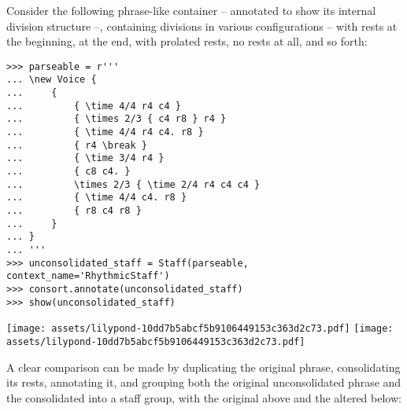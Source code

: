 Consider the following phrase-like container -- annotated to show its internal
division structure --, containing divisions in various configurations --
with rests at the beginning, at the end, with prolated rests, no rests at all,
and so forth:

\begin{comment}
<abjad>
parseable = r'''
\new Voice {
    {
        { \time 4/4 r4 c4 }
        { \times 2/3 { c4 r8 } r4 }
        { \time 4/4 r4 c4. r8 }
        { r4 \break }
        { \time 3/4 r4 }
        { c8 c4. }
        \times 2/3 { \time 2/4 r4 c4 c4 }
        { \time 4/4 c4. r8 }
        { r8 c4 r8 }
    }
}
'''
unconsolidated_staff = Staff(parseable, context_name='RhythmicStaff')
consort.annotate(unconsolidated_staff)
show(unconsolidated_staff)
</abjad>
\end{comment}

\begin{abjadbookoutput}
\begin{singlespacing}
\vspace{-0.5\baselineskip}
\begin{verbatim}
>>> parseable = r'''
... \new Voice {
...     {
...         { \time 4/4 r4 c4 }
...         { \times 2/3 { c4 r8 } r4 }
...         { \time 4/4 r4 c4. r8 }
...         { r4 \break }
...         { \time 3/4 r4 }
...         { c8 c4. }
...         \times 2/3 { \time 2/4 r4 c4 c4 }
...         { \time 4/4 c4. r8 }
...         { r8 c4 r8 }
...     }
... }
... '''
>>> unconsolidated_staff = Staff(parseable, context_name='RhythmicStaff')
>>> consort.annotate(unconsolidated_staff)
>>> show(unconsolidated_staff)
\end{verbatim}
\noindent\texttt{[image: assets/lilypond-10dd7b5abcf5b9106449153c363d2c73.pdf]}
\newline
\newline
\noindent\texttt{[image: assets/lilypond-10dd7b5abcf5b9106449153c363d2c73.pdf]}
\end{singlespacing}
\end{abjadbookoutput}

\noindent A clear comparison can be made by duplicating the original phrase,
consolidating its rests, annotating it, and grouping both the original
unconsolidated phrase and the consolidated into a staff group, with the
original above and the altered below:

\begin{comment}
<abjad>
consolidated_staff = Staff(parseable, context_name='RhythmicStaff')
for voice in consolidated_staff:
    for phrase in voice:
        phrase = consort.SegmentMaker.consolidate_rests(phrase)

consort.annotate(consolidated_staff)
staff_group = StaffGroup([unconsolidated_staff, consolidated_staff])
show(staff_group)
</abjad>
\end{comment}

